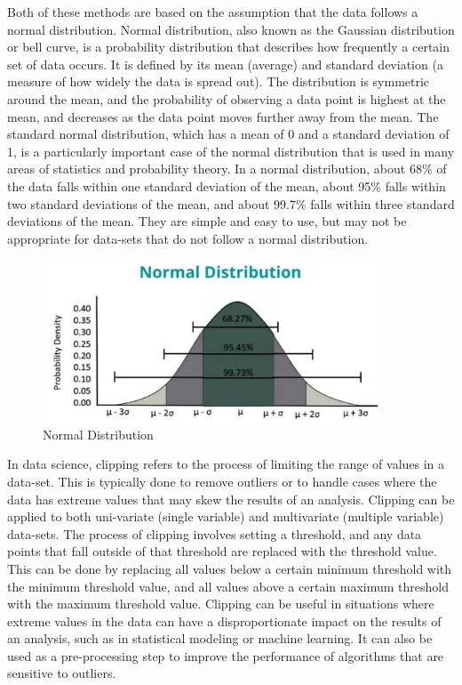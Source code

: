 Both of these methods are based on the assumption that the data follows a normal distribution. Normal distribution, also known as the Gaussian distribution or bell curve, is a probability distribution that describes how frequently a certain set of data occurs. It is defined by its mean (average) and standard deviation (a measure of how widely the data is spread out). The distribution is symmetric around the mean, and the probability of observing a data point is highest at the mean, and decreases as the data point moves further away from the mean. The standard normal distribution, which has a mean of 0 and a standard deviation of 1, is a particularly important case of the normal distribution that is used in many areas of statistics and probability theory. In a normal distribution, about 68\% of the data falls within one standard deviation of the mean, about 95\% falls within two standard deviations of the mean, and about 99.7\% falls within three standard deviations of the mean. They are simple and easy to use, but may not be appropriate for data-sets that do not follow a normal distribution.

\begin{figure}[!h]
    	\centering
    	\includegraphics[width= 0.9\textwidth]{images/Normal-Distribution-1-1024x556.jpg}
    	\caption [Normal Distribution]{Normal Distribution \protect\cite{Normal}}  
    	\label{fig:Guassian Distribution}
\end{figure}


In data science, clipping refers to the process of limiting the range of values in a data-set. This is typically done to remove outliers or to handle cases where the data has extreme values that may skew the results of an analysis. Clipping can be applied to both uni-variate (single variable) and multivariate (multiple variable) data-sets. The process of clipping involves setting a threshold, and any data points that fall outside of that threshold are replaced with the threshold value. This can be done by replacing all values below a certain minimum threshold with the minimum threshold value, and all values above a certain maximum threshold with the maximum threshold value. Clipping can be useful in situations where extreme values in the data can have a disproportionate impact on the results of an analysis, such as in statistical modeling or machine learning. It can also be used as a pre-processing step to improve the performance of algorithms that are sensitive to outliers. 

